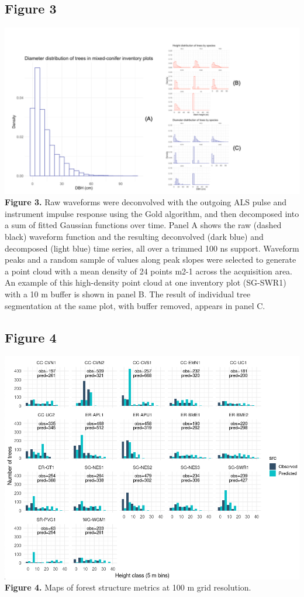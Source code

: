 \documentclass[
  12pt,
]{article}
\begin{document}
\newpage

\hypertarget{figure-3}{%
\subsection{Figure 3}\label{figure-3}}

\includegraphics{./Figures/Fig3.png} \textbf{Figure 3.} Raw waveforms
were deconvolved with the outgoing ALS pulse and instrument impulse
response using the Gold algorithm, and then decomposed into a sum of
fitted Gaussian functions over time. Panel A shows the raw (dashed
black) waveform function and the resulting deconvolved (dark blue) and
decomposed (light blue) time series, all over a trimmed 100 ns support.
Waveform peaks and a random sample of values along peak slopes were
selected to generate a point cloud with a mean density of 24 points m2-1
across the acquisition area. An example of this high-density point cloud
at one inventory plot (SG-SWR1) with a 10 m buffer is shown in panel B.
The result of individual tree segmentation at the same plot, with buffer
removed, appears in panel C. \clearpage

\newpage

\hypertarget{figure-4}{%
\subsection{Figure 4}\label{figure-4}}

\includegraphics{./Figures/Fig4.png} \textbf{Figure 4.} Maps of forest
structure metrics at 100 m grid resolution. \clearpage
\end{document}
